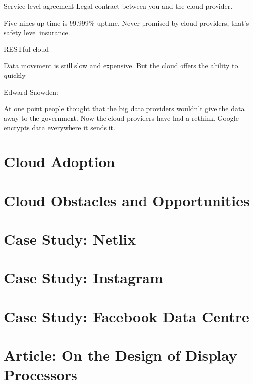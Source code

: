 \documentclass[11pt]{article}
\begin{document}
Service level agreement
Legal contract between you and the cloud provider.

Five nines up time is 99.999\% uptime. Never promised by cloud providers, that’s safety level insurance.

RESTful cloud

Data movement is still slow and expensive. But the cloud offers the ability to quickly 

Edward Snowden:

At one point people thought that the big data providers wouldn’t give the data away to the government. Now the cloud providers have had a rethink, Google encrypts data everywhere it sends it.



\section{Cloud Adoption}


\section{Cloud Obstacles and Opportunities}


\section{Case Study: Netlix}


\section{Case Study: Instagram}


\section{Case Study: Facebook Data Centre}


\section{Article: On the Design of Display Processors}
\end{document}
